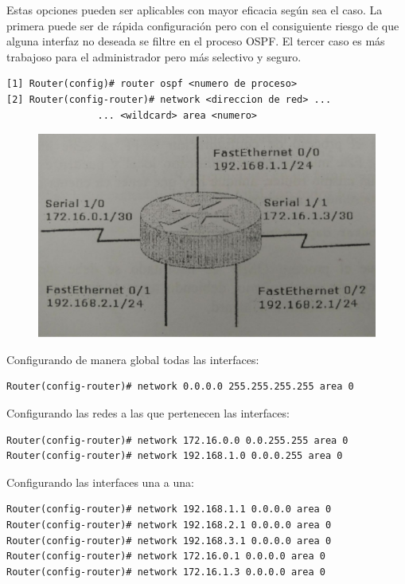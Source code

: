 \documentclass[12pt]{article}
\begin{document}
Estas opciones pueden ser aplicables con mayor eficacia según sea el caso. La primera puede ser de rápida configuración pero con el consiguiente riesgo de que alguna interfaz no deseada se filtre en el proceso OSPF. El tercer caso es más trabajoso para el administrador pero más selectivo y seguro.\\

\begin{lstlisting}
[1] Router(config)# router ospf <numero de proceso>
[2] Router(config-router)# network <direccion de red> ...
				... <wildcard> area <numero>
\end{lstlisting}

\begin{figure}[h]
\centering
\includegraphics[scale=0.25]{ospf_example_addressing.jpg}
\end{figure}

Configurando de manera global todas las interfaces:
\begin{lstlisting}
Router(config-router)# network 0.0.0.0 255.255.255.255 area 0
\end{lstlisting}

Configurando las redes a las que pertenecen las interfaces:
\begin{lstlisting}
Router(config-router)# network 172.16.0.0 0.0.255.255 area 0
Router(config-router)# network 192.168.1.0 0.0.0.255 area 0
\end{lstlisting}

Configurando las interfaces una a una:
\begin{lstlisting}
Router(config-router)# network 192.168.1.1 0.0.0.0 area 0
Router(config-router)# network 192.168.2.1 0.0.0.0 area 0
Router(config-router)# network 192.168.3.1 0.0.0.0 area 0
Router(config-router)# network 172.16.0.1 0.0.0.0 area 0
Router(config-router)# network 172.16.1.3 0.0.0.0 area 0
\end{lstlisting}
\end{document}
